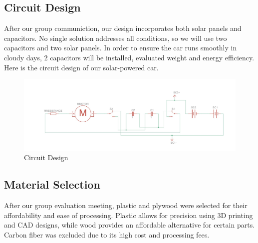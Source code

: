 \documentclass[12pt]{article}
\begin{document}
\subsection{Circuit Design}
After our group communiction, our design incorporates both solar panels and capacitors. 
No single solution addresses all conditions, so we will use two capacitors and two solar panels.
In order to ensure the car runs smoothly in cloudy days, 2 capacitors will be installed, evaluated weight and energy efficiency.
Here is the circuit design of our solar-powered car.
\begin{figure}[h] 
    \centering 
    \includegraphics[width=1\textwidth]{figure/circute_design.jpeg} 
    \caption{Circuit Design} 
\end{figure}
\subsection{Material Selection}
After our group evaluation meeting, plastic and plywood were selected for their affordability and ease of processing.
Plastic allows for precision using 3D printing and CAD designs, 
while wood provides an affordable alternative for certain parts. 
Carbon fiber was excluded due to its high cost and processing fees.
\end{document}
